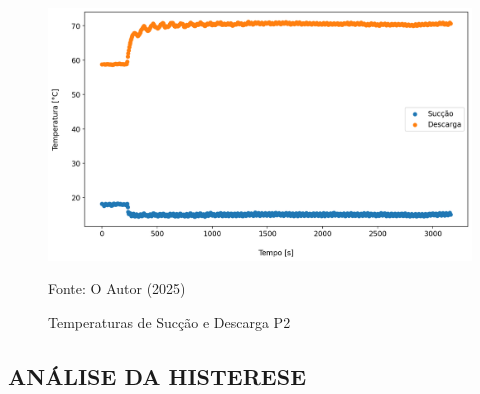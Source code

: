 \begin{figure}[h]
    \centering
    \includegraphics[width=1\linewidth]{FigurasdoTexto/Temperaturas de Sucção e Descarga P2.png}
    \caption{Temperaturas de Sucção e Descarga P2}
    \label{fig:Temperaturas de Sucção e Descarga P2}
    {\footnotesize Fonte: O Autor (2025)}
\end{figure}

\subsection{\MakeUppercase{Análise da Histerese}}

